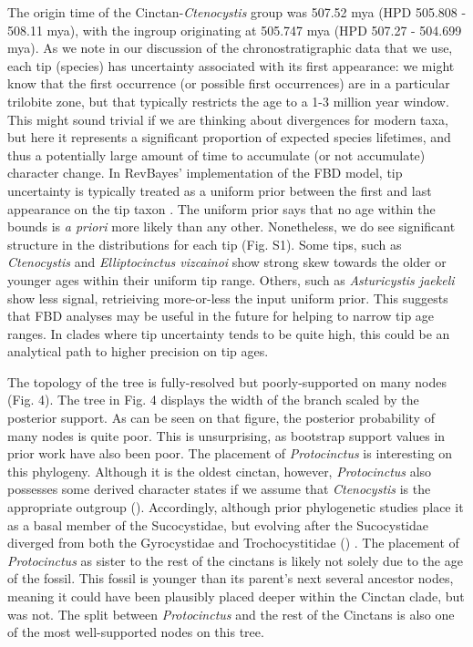 \documentclass{article}
\begin{document}
The origin time of the Cinctan-\textit{Ctenocystis} group was 507.52 mya (HPD 505.808 - 508.11 mya), with the ingroup originating at 505.747 mya (HPD 507.27 - 504.699 mya).
As we note in our discussion of the chronostratigraphic data that we use, each tip (species) has uncertainty associated with its first appearance: we might know that the first occurrence (or possible first occurrences) are in a particular trilobite zone, but that typically restricts the age to a 1-3 million year window.  This might sound trivial if we are thinking about divergences for modern taxa, but here it represents a significant proportion of expected species lifetimes, and thus a potentially large amount of time to accumulate (or not accumulate) character change.
In RevBayes' implementation of the FBD model, tip uncertainty is typically treated as a uniform prior between the first and last appearance on the tip taxon \citep{baridosottani2020}.
The uniform prior says that no age within the bounds is \textit{a priori} more likely than any other.
Nonetheless, we do see significant structure in the distributions for each tip (Fig. S1). 
Some tips, such as \textit{Ctenocystis} and \textit{Elliptocinctus vizcainoi} show strong skew towards the older or younger ages within their uniform tip range.
Others, such as \textit{Asturicystis jaekeli} show less signal, retrieiving more-or-less the input uniform prior.
This suggests that FBD analyses may be useful in the future for helping to narrow tip age ranges.
In clades where tip uncertainty tends to be quite high, this could be an analytical path to higher precision on tip ages.

The topology of the tree is fully-resolved but poorly-supported on many nodes (Fig. 4).
The tree in Fig. 4 displays the width of the branch scaled by the posterior support.
As can be seen on that figure, the posterior probability of many nodes is quite poor. 
This is unsurprising, as bootstrap support values in prior work \citep{ZamoraEtAl2013} have also been poor.
The placement of \textit{Protocinctus} is interesting on this phylogeny. 
Although it is the oldest cinctan, however, \textit{Protocinctus} also possesses some derived character states if we assume that \textit{Ctenocystis} is the appropriate outgroup (\cite{Rahman2009a}).  Accordingly, although prior phylogenetic studies place it as a basal member of the Sucocystidae, but evolving after the Sucocystidae diverged from both the Gyrocystidae and Trochocystitidae (\cite{SmithZamora2009, ZamoraRahmanSmith2013}) . 
The placement of \textit{Protocinctus} as sister to the rest of the cinctans is likely not solely due to the age of the fossil. This fossil is younger than its parent's next several ancestor nodes, meaning it could have been plausibly placed deeper within the Cinctan clade, but was not. 
The split between \textit{Protocinctus} and the rest of the Cinctans is also one of the most well-supported nodes on this tree.
\end{document}
